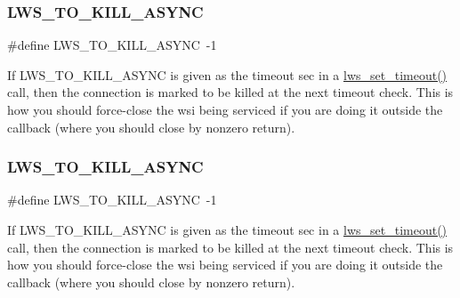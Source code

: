 \subsubsection{\texorpdfstring{L\+W\+S\+\_\+\+T\+O\+\_\+\+K\+I\+L\+L\+\_\+\+A\+S\+Y\+NC}{LWS\_TO\_KILL\_ASYNC}\hspace{0.1cm}{\footnotesize\ttfamily [2/6]}}
{\footnotesize\ttfamily \#define L\+W\+S\+\_\+\+T\+O\+\_\+\+K\+I\+L\+L\+\_\+\+A\+S\+Y\+NC~-\/1}

If L\+W\+S\+\_\+\+T\+O\+\_\+\+K\+I\+L\+L\+\_\+\+A\+S\+Y\+NC is given as the timeout sec in a \hyperlink{group__timeout_gaced9f9237f6172fed9f730a2af51345a}{lws\+\_\+set\+\_\+timeout()} call, then the connection is marked to be killed at the next timeout check. This is how you should force-\/close the wsi being serviced if you are doing it outside the callback (where you should close by nonzero return). \mbox{\label{group__timeout_ga6a53a9a771c08417ffe75c953b58f015}} 
\subsubsection{\texorpdfstring{L\+W\+S\+\_\+\+T\+O\+\_\+\+K\+I\+L\+L\+\_\+\+A\+S\+Y\+NC}{LWS\_TO\_KILL\_ASYNC}\hspace{0.1cm}{\footnotesize\ttfamily [3/6]}}
{\footnotesize\ttfamily \#define L\+W\+S\+\_\+\+T\+O\+\_\+\+K\+I\+L\+L\+\_\+\+A\+S\+Y\+NC~-\/1}

If L\+W\+S\+\_\+\+T\+O\+\_\+\+K\+I\+L\+L\+\_\+\+A\+S\+Y\+NC is given as the timeout sec in a \hyperlink{group__timeout_gaced9f9237f6172fed9f730a2af51345a}{lws\+\_\+set\+\_\+timeout()} call, then the connection is marked to be killed at the next timeout check. This is how you should force-\/close the wsi being serviced if you are doing it outside the callback (where you should close by nonzero return). \mbox{\label{group__timeout_ga6a53a9a771c08417ffe75c953b58f015}} 
